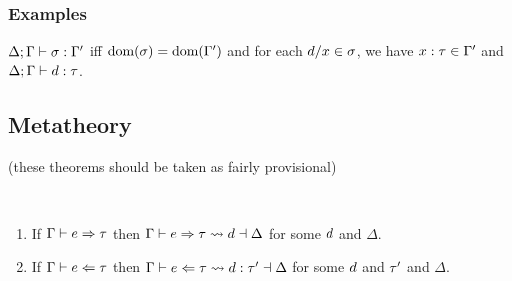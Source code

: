 



{\color{gray}\blindtext}
{\color{gray}\blindtext}
{\color{gray}\blindtext}
{\color{gray}\blindtext}
{\color{gray}\blindtext}

\subsubsection{Examples}








  \begin{definition}
    $\Delta; \Gamma \vdash \sigma : \Gamma'$ iff $\text{dom}(\sigma) = \text{dom}(\Gamma')$ and for each $d/x \in \sigma$, we have $x : \tau \in \Gamma'$ and $\Delta; \Gamma \vdash d : \tau$.
  \end{definition}








\clearpage
\subsection{Metatheory }



(these theorems should be taken as fairly provisional)

\begin{theorem}[Expandability \cy{??}] ~
  \begin{enumerate}
    \item If $\Gamma \vdash e \Rightarrow \tau$ then $\Gamma \vdash e \Rightarrow \tau \leadsto d \dashv \Delta$ for some $d$ and $\Delta$.
    \item If $\Gamma \vdash e \Leftarrow \tau$ then $\Gamma \vdash e \Leftarrow \tau \leadsto d : \tau' \dashv \Delta$ for some $d$ and $\tau'$ and $\Delta$.
  \end{enumerate}
\end{theorem}

